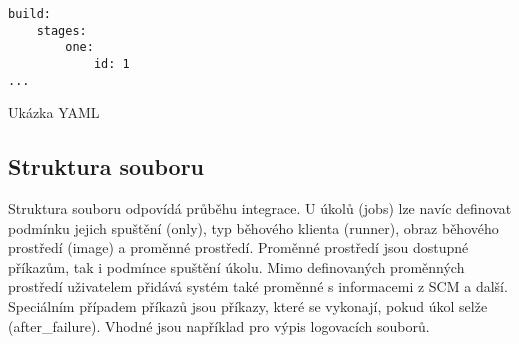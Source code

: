 \begin{listing}[ht]
\begin{verbatim}
build:
    stages:
        one:
            id: 1
...
\end{verbatim}
\caption{Ukázka YAML}
\label{listing:yaml}
\end{listing}

\subsection{Struktura souboru}

Struktura souboru odpovídá průběhu integrace.
U úkolů (jobs) lze navíc definovat podmínku jejich spuštění (only), typ běhového klienta (runner), obraz běhového prostředí (image) a proměnné prostředí.
Proměnné prostředí jsou dostupné příkazům, tak i podmínce spuštění úkolu.
Mimo definovaných proměnných prostředí uživatelem přidává systém také proměnné s informacemi z SCM a další.
Speciálním případem příkazů jsou příkazy, které se vykonají, pokud úkol selže (after\_failure).
Vhodné jsou například pro výpis logovacích souborů.


